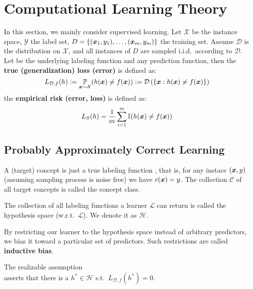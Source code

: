 \section{Computational Learning Theory}
In this section, we mainly consider supervised learning.
Let $\mathcal{X}$ be the instance space, $\mathcal{Y}$ the label set, $D = \{(\boldsymbol{x}_1, y_1), \ldots, 
(\boldsymbol{x}_m, y_m)\}$ the training set. Assume $\mathcal{D}$ is the distribution on $\mathcal{X}$, and all 
instances of $D$ are sampled i.i.d.\ according to $\mathcal{D}$. Let  be the underlying labeling 
function and  any prediction function, then the \textbf{true (generalization) loss (error)} is defined
as:
$$L_{\mathcal{D}, f}(h) := \operatorname*{\mathbb{P}}_{\boldsymbol{x}\sim\mathcal{X}}(h(\boldsymbol{x})\neq f(\boldsymbol{x})) := \mathcal{D}\left(\{\boldsymbol{x}: h(\boldsymbol{x})
\neq f(\boldsymbol{x})\}\right)$$
the \textbf{empirical risk (error, loss)} is defined as:
$$L_S(h) = \frac{1}{m}\sum_{i=1}^m \operatorname{\mathbb{I}}(h(\boldsymbol{x})\neq f(\boldsymbol{x}))$$

\subsection{Probably Approximately Correct Learning}

\begin{df}
    A (target) concept is just a true labeling function , that is, for any instace $(\boldsymbol{x}, y)$ 
    (assuming sampling process is noise free) we have $c(\boldsymbol{x}) = y$. The collection $\mathcal{C}$ of all 
    target concepts is called the concept class.
\end{df}

\begin{df}
    The collection of all labeling functions  a learner $\mathcal{L}$ can return is called the 
    hypothesis space (w.r.t.\ $\mathcal{L}$). We denote it as $\mathcal{H}$.
\end{df}

\begin{re}
    By restricting our learner to the hypothesis space instead of arbitrary predictors, we bias it toward a 
    particular set of predictors. Such restrictions are called \textbf{inductive bias}.
\end{re}

\begin{df}
    The realizable assumption \\asserts that there is a $h^* \in \mathcal{H}$ s.t.\ 
    $L_{\mathcal{D}, f}(h^*) = 0$.
\end{df}


